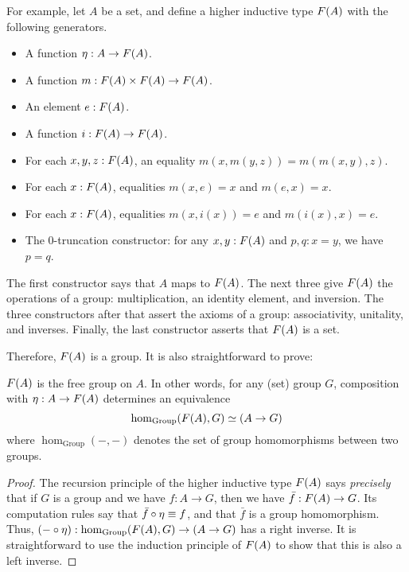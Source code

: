 For example, let $A$ be a set, and define a higher inductive type $F(A)$ with the following generators.
\begin{itemize}
\item A function $\eta:A\to F(A)$.
\item A function $m: F(A) \times F(A) \to F(A)$.
\item An element $e:F(A)$.
\item A function $i:F(A) \to F(A)$.
\item For each $x,y,z:F(A)$, an equality $m(x,m(y,z)) = m(m(x,y),z)$.
\item For each $x:F(A)$, equalities $m(x,e) = x$ and $m(e,x) = x$.
\item For each $x:F(A)$, equalities $m(x,i(x)) = e$ and $m(i(x),x) = e$.
\item The $0$-truncation constructor: for any $x,y:F(A)$ and $p,q:x=y$, we have $p=q$.
\end{itemize}
The first constructor says that $A$ maps to $F(A)$.
The next three give $F(A)$ the operations of a group: multiplication, an identity element, and inversion.
The three constructors after that assert the axioms of a group: associativity, unitality, and inverses.
Finally, the last constructor asserts that $F(A)$ is a set.

Therefore, $F(A)$ is a group.
It is also straightforward to prove:

\begin{thm}
  $F(A)$ is the free group on $A$.
  In other words, for any (set) group $G$, composition with $\eta:A\to F(A)$ determines an equivalence
  \[ \hom_{\mathrm{Group}}(F(A),G) \simeq (A\to G) \]
  where $\hom_{\mathrm{Group}}(-,-)$ denotes the set of group homomorphisms between two groups.
\end{thm}
\begin{proof}
  The recursion principle of the higher inductive type $F(A)$ says \emph{precisely} that if $G$ is a group and we have $f:A\to G$, then we have $\bar{f}:F(A) \to G$.
  Its computation rules say that $\bar{f}\circ \eta \equiv f$, and that $\bar f$ is a group homomorphism.
  Thus, $(-\circ \eta) :  \hom_{\mathrm{Group}}(F(A),G) \to (A\to G)$ has a right inverse.
  It is straightforward to use the induction principle of $F(A)$ to show that this is also a left inverse.
\end{proof}

